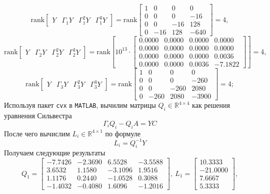 \documentclass[a4paper, 12pt]{article}
\begin{document}
    $$
    \text{rank}\begin{bmatrix}Y &\Gamma_1Y &\Gamma_1^2Y &\Gamma_1^3Y\end{bmatrix}=\text{rank}\begin{bmatrix}
    1     &0     &0     &0\\
    0     &0     &0   &-16\\
    0     &0   &-16   &128\\
    0   &-16   &128  &-640
    \end{bmatrix}=4,
    $$
    $$
    \text{rank}\begin{bmatrix}Y &\Gamma_2Y &\Gamma_2^2Y &\Gamma_2^3Y\end{bmatrix}=\text{rank}\left[10^{13}\cdot\begin{bmatrix}
        0.0000         &0.0000         &0.0000         &0.0000\\
        0.0000         &0.0000         &0.0000   &0.0000\\
        0.0000         &0.0000   &0.0000    &0.0036\\
        0.0000   &0.0000    &0.0036   &-7.1822
    \end{bmatrix}\right]=4,
    $$
    $$
    \text{rank}\begin{bmatrix}Y &\Gamma_3Y &\Gamma_3^2Y &\Gamma_3^3Y\end{bmatrix}=\text{rank}\begin{bmatrix}
        1           &0           &0           &0\\
        0           &0           &0        &-260\\
        0           &0        &-260        &2080\\
        0        &-260        &2080       &-3900
    \end{bmatrix}=4;
    $$
    Используя пакет \texttt{cvx} в \texttt{MATLAB}, вычилим матрицы $Q_i\in\mathbb{R}^{4\times4}$ как решения уравнения Сильвестра
    $$
    \Gamma_iQ_i-Q_iA=YC
    $$
    После чего вычислим $L_i\in\mathbb{R}^{4\times1}$ по формуле
    $$
    L_i=Q_i^{-1}Y
    $$
    Получаем следующие результаты
    $$
    Q_1=\begin{bmatrix}
    -7.7426   &-2.3690    &6.5528   &-3.5588\\
    3.6532    &1.1580   &-3.1096    &1.9516\\
    1.1176    &0.2440   &-1.0528    &0.3088\\
   -1.4032   &-0.4080    &1.6096   &-1.2016
    \end{bmatrix},\ L_1=\begin{bmatrix}
    10.3333\\
  -21.0000\\
    7.6667\\
    5.3333
    \end{bmatrix},
    $$
\end{document}

